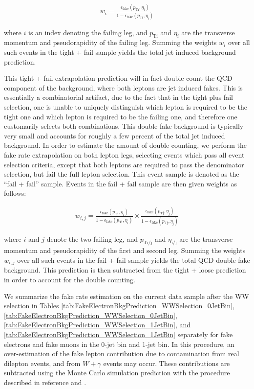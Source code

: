 \begin{eqnarray}
  w_{i} = \frac{\epsilon_{\mathrm{fake}}(p_{\mathrm{T i}},\eta_{i})}{1 - \epsilon_{\mathrm{fake}}(p_{\mathrm{T i}},\eta_{i})}
\end{eqnarray}

where $i$ is an index denoting the failing leg, and $p_{\mathrm{T i}}$ and $\eta_{i}$
are the transverse momentum and pseudorapidity of the failing leg. 
Summing the weights $w_{i}$ over all such events in the tight + fail sample yields
the total jet induced background prediction.

This tight + fail extrapolation prediction will in fact 
double count the QCD component of the background, where both leptons are jet induced
fakes. This is essentially a combinatorial artifact, due to the fact that in the tight
plus fail selection, one is unable to uniquely distinguish which lepton is required to
be the tight one and which lepton is required to be the failing one, and therefore
one customarily selects both combinations. This double fake background is 
typically very small and accounts for roughly a few percent of the total jet
induced background. In order to estimate the amount of double counting,
we perform the fake rate extrapolation on both lepton legs, selecting events
which pass all event selection criteria, except that both leptons are required
to pass the denominator selection, but fail the full lepton selection. This
event sample is denoted as the ``fail + fail'' sample. Events in the fail + fail
sample are then given weights as follows:

\begin{eqnarray}
  w_{i,j} = \frac{\epsilon_{\mathrm{fake}}(p_{\mathrm{T i}},\eta_{\mathrm{i}})}{1 - \epsilon_{\mathrm{fake}}(p_{\mathrm{T i}},\eta_{\mathrm{i}})} \times \frac{\epsilon_{\mathrm{fake}}(p_{\mathrm{T j}},\eta_{\mathrm{j}})}{1 - \epsilon_{\mathrm{fake}}(p_{\mathrm{T j}},\eta_{\mathrm{j}})}
\end{eqnarray}

where $i$ and $j$ denote the two failing leg, and $p_{\mathrm{T i/j}}$ and $\eta_{\mathrm{i/j}}$
are the transverse momentum and pseudorapidity of the first and second leg.
Summing the weights $w_{i,j}$ over all such events in the fail + fail sample yields
the total QCD double fake background. This prediction is then subtracted from the
tight + loose prediction in order to account for the double counting. 

We summarize the fake rate estimation on the current data sample after the WW selection in Tables
\ref{tab:FakeElectronBkgPrediction_WWSelection_0JetBin}, 
\ref{tab:FakeElectronBkgPrediction_WWSelection_0JetBin},
\ref{tab:FakeElectronBkgPrediction_WWSelection_1JetBin}, and
\ref{tab:FakeElectronBkgPrediction_WWSelection_1JetBin} separately for fake electrons and fake muons in the
0-jet bin and 1-jet bin. In this procedure, an over-estimation of the fake lepton contribution due to 
contamination from real dilepton events, and from $W+\gamma$ events may occur. These contributions 
are subtracted using the Monte Carlo simulation prediction with the procedure described in reference
 \cite{fakeLeptonNote1} and \cite{fakeLeptonBkgSpillage1}.



